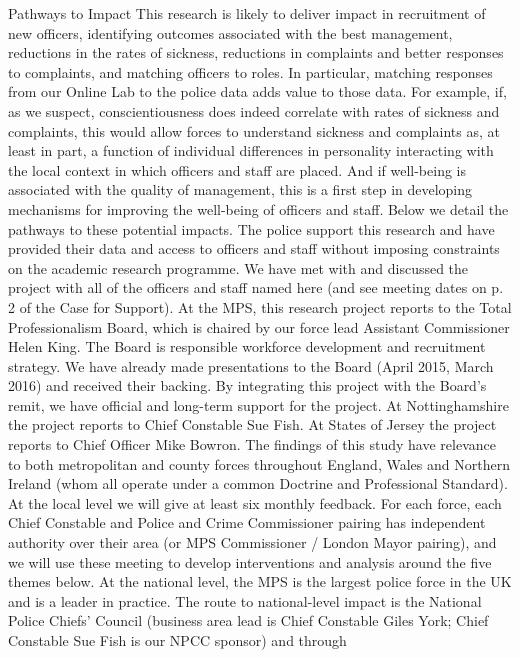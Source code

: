 Pathways to Impact
This research is likely to deliver impact in recruitment of new officers, identifying outcomes
associated with the best management, reductions in the rates of sickness, reductions in
complaints and better responses to complaints, and matching officers to roles. In particular,
matching responses from our Online Lab to the police data adds value to those data. For
example, if, as we suspect, conscientiousness does indeed correlate with rates of sickness
and complaints, this would allow forces to understand sickness and complaints as, at least in
part, a function of individual differences in personality interacting with the local context in
which officers and staff are placed. And if well-being is associated with the quality of
management, this is a first step in developing mechanisms for improving the well-being of
officers and staff. Below we detail the pathways to these potential impacts.
The police support this research and have provided their data and access to officers and
staff without imposing constraints on the academic research programme. We have met with
and discussed the project with all of the officers and staff named here (and see meeting
dates on p. 2 of the Case for Support). At the MPS, this research project reports to the Total
Professionalism Board, which is chaired by our force lead Assistant Commissioner Helen
King. The Board is responsible workforce development and recruitment strategy. We have
already made presentations to the Board (April 2015, March 2016) and received their
backing. By integrating this project with the Board’s remit, we have official and long-term
support for the project. At Nottinghamshire the project reports to Chief Constable Sue Fish.
At States of Jersey the project reports to Chief Officer Mike Bowron.
The findings of this study have relevance to both metropolitan and county forces throughout
England, Wales and Northern Ireland (whom all operate under a common Doctrine and
Professional Standard). At the local level we will give at least six monthly feedback. For each
force, each Chief Constable and Police and Crime Commissioner pairing has independent
authority over their area (or MPS Commissioner / London Mayor pairing), and we will use
these meeting to develop interventions and analysis around the five themes below. At the
national level, the MPS is the largest police force in the UK and is a leader in practice. The
route to national-level impact is the National Police Chiefs’ Council (business area lead is
Chief Constable Giles York; Chief Constable Sue Fish is our NPCC sponsor) and through

